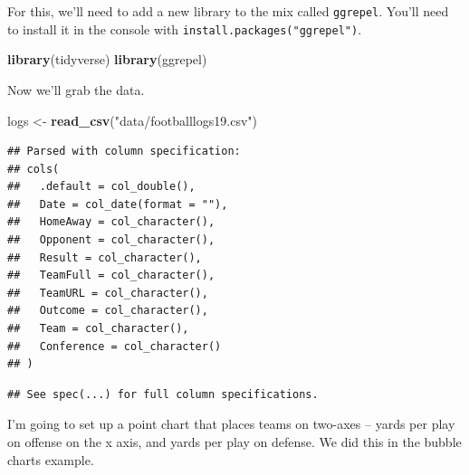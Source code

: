 \documentclass[
]{book}
\newenvironment{Shaded}{\begin{snugshade}}{\end{snugshade}}
\newcommand{\DataTypeTok}[1]{\textcolor[rgb]{0.13,0.29,0.53}{#1}}
\newcommand{\KeywordTok}[1]{\textcolor[rgb]{0.13,0.29,0.53}{\textbf{#1}}}
\newcommand{\NormalTok}[1]{#1}
\newcommand{\OperatorTok}[1]{\textcolor[rgb]{0.81,0.36,0.00}{\textbf{#1}}}
\newcommand{\StringTok}[1]{\textcolor[rgb]{0.31,0.60,0.02}{#1}}
\begin{document}
For this, we'll need to add a new library to the mix called \texttt{ggrepel}. You'll need to install it in the console with \texttt{install.packages("ggrepel")}.

\begin{Shaded}
\begin{Highlighting}[]
\KeywordTok{library}\NormalTok{(tidyverse)}
\KeywordTok{library}\NormalTok{(ggrepel)}
\end{Highlighting}
\end{Shaded}

Now we'll grab the data.

\begin{Shaded}
\begin{Highlighting}[]
\NormalTok{logs <-}\StringTok{ }\KeywordTok{read_csv}\NormalTok{(}\StringTok{"data/footballlogs19.csv"}\NormalTok{)}
\end{Highlighting}
\end{Shaded}

\begin{verbatim}
## Parsed with column specification:
## cols(
##   .default = col_double(),
##   Date = col_date(format = ""),
##   HomeAway = col_character(),
##   Opponent = col_character(),
##   Result = col_character(),
##   TeamFull = col_character(),
##   TeamURL = col_character(),
##   Outcome = col_character(),
##   Team = col_character(),
##   Conference = col_character()
## )
\end{verbatim}

\begin{verbatim}
## See spec(...) for full column specifications.
\end{verbatim}

I'm going to set up a point chart that places teams on two-axes -- yards per play on offense on the x axis, and yards per play on defense. We did this in the bubble charts example.

\begin{Shaded}
\end{Shaded}
\end{document}
